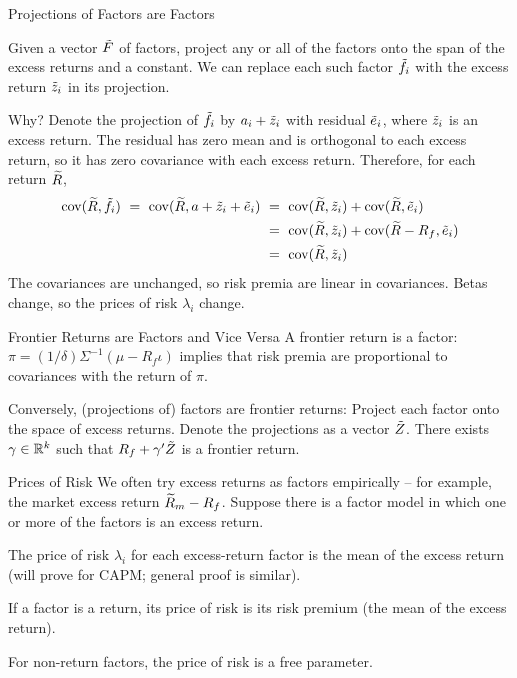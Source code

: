 \documentclass[xcolor=dvipsnames,10pt]{beamer}
\begin{document}
\begin{frame}{Projections of Factors are Factors}

Given a vector $\tilde{F}$ of factors, project any or all of the factors onto the span of the excess returns and a constant.  We can replace each such factor $\tilde{f}_i$ with the excess return $\tilde{z}_i$ in its projection.  

Why?  Denote the projection of $\tilde{f}_i$ by $a_i + \tilde{z}_i$ with residual $\tilde{e}_i$, where $\tilde{z}_i$ is an excess return.  The residual has zero mean and is orthogonal to each excess return, so it has zero covariance with each excess return.  Therefore, for each return $\widetilde{R}$,  
\begin{align*}
\cov(\tr,\tf_i) \ = \ \cov(\tr,a+ \tz_i + \te_i) \ &= \ \cov(\tr,\tz_i) + \cov(\tr,\te_i)\\
&= \ \cov(\tr,\tz_i) + \cov(\tr-R_f,\te_i)\\
&   = \ \cov(\tr,\tz_i)
\end{align*}
The covariances are unchanged, so risk premia are linear in covariances.  Betas change, so the prices of risk $\lambda_i$ change.
\end{frame}

\begin{frame}{Frontier Returns are Factors and Vice Versa}
A frontier return is a factor: $\pi = (1/\delta)\Sigma^{-1}(\mu - R_f\iota)$ implies that risk premia are proportional to covariances with the return of $\pi$.

Conversely, (projections of) factors are frontier returns: Project each factor onto the space of excess returns.  Denote the projections as a vector $\tilde{Z}$.  There exists $\gamma \in \mathbb{R}^k$ such that $R_f + \gamma'\tilde{Z}$ is a frontier return.  
\end{frame}

\begin{frame}{Prices of Risk}
We often try excess returns as factors empirically -- for example, the market excess return $\widetilde{R}_m - R_f$.  Suppose there is a factor model in which one or more of the factors is an excess return.

The price of risk $\lambda_i$ for each excess-return factor is the mean of the excess return (will prove for CAPM; general proof is similar).

If a factor is a return, its price of risk is its risk premium (the mean of the excess return).

For non-return factors, the price of risk is a free parameter.
\end{frame}
\end{document}
